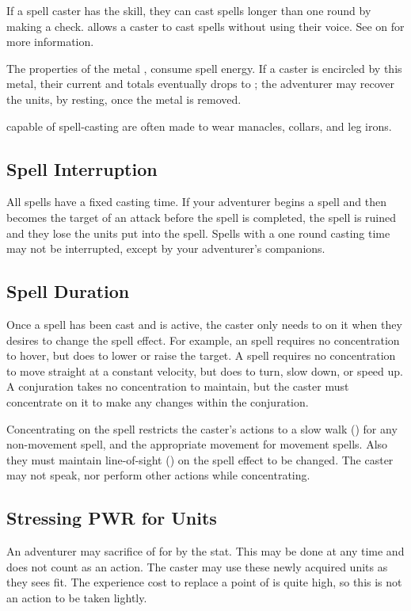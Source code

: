 \begin{multicols*}{2}
If a spell caster has the  skill, they can cast spells longer than one round by making a check.  allows a caster to cast spells without using their voice. See  on  for more information.

The properties of the metal , consume spell energy. If a caster is encircled by this metal, their current \EU and \DU totals eventually drops to ; the adventurer may recover the units, by resting, once the metal is removed. 

 capable of spell-casting are often made to wear manacles, collars, and leg irons.
\subsection{Spell Interruption}
All spells have a fixed casting time. If your adventurer begins a spell and then becomes the target of an attack before the spell is completed, the spell is ruined and they lose the units put into the spell. Spells with a one round casting time may not be interrupted, except by your adventurer's companions. 

\subsection{Spell Duration}
Once a spell has been cast and is active, the caster only needs to  on it when they desires to change the spell effect. For example, an  spell requires no concentration to hover, but does to lower or raise the target. A  spell requires no concentration to move straight at a constant velocity, but does to turn, slow down, or speed up. A conjuration takes no concentration to maintain, but the caster must concentrate on it to make any changes within the conjuration.

Concentrating on the spell restricts the caster's actions to a slow walk () for any non-movement spell, and the appropriate movement for movement spells. Also they must maintain line-of-sight () on the spell effect to be changed. The caster may not speak, nor perform other actions while concentrating.
\subsection{Stressing PWR for Units}
An adventurer may sacrifice  of \PWR for  by  the stat. This may be done at any time and does not count as an action. The caster may use these newly acquired units as they sees fit. The experience cost to replace a point of \PWR is quite high, so this is not an action to be taken lightly.

\end{multicols*}
